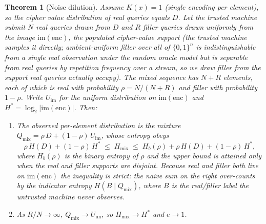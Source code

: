 \documentclass[11pt]{article}
\theoremstyle{definition}
\theoremstyle{plain}
\newtheorem{theorem}{Theorem}[section]
\theoremstyle{remark}
\newcommand{\enc}{\mathrm{enc}}
\newcommand{\B}{\{0,1\}}
\begin{document}
\begin{theorem}[Noise dilution]
\label{thm:noise-dilution}
Assume $K(x) = 1$ (single encoding per element), so the cipher value
distribution of real queries equals $D$.
Let the trusted machine submit $N$ real queries drawn from $D$ and
$R$ filler queries drawn uniformly from the image $\mathrm{im}(\enc)$,
the populated cipher-value support (the trusted machine samples it
directly; ambient-uniform filler over all of $\B^n$ is indistinguishable
from a single real observation under the random oracle model but is
separable from real queries by repetition frequency over a stream, so we
draw filler from the support real queries actually occupy).  The mixed
sequence has $N + R$ elements, each of which is real with probability
$\rho = N / (N + R)$ and filler with probability $1 - \rho$.  Write
$U_{\mathrm{im}}$ for the uniform distribution on $\mathrm{im}(\enc)$ and
$H^* = \log_2|\mathrm{im}(\enc)|$.  Then:
\begin{enumerate}
\item The observed per-element distribution is the mixture
  $Q_{\mathrm{mix}} = \rho\,D + (1 - \rho)\,U_{\mathrm{im}}$, whose
  entropy obeys
\begin{equation}
\label{eq:noise-entropy}
\rho\,H(D) + (1 - \rho)\,H^*
\;\leq\; H_{\mathrm{mix}}
\;\leq\; H_b(\rho) + \rho\,H(D) + (1 - \rho)\,H^*,
\end{equation}
where $H_b(\rho)$ is the binary entropy of $\rho$ and the upper bound is
attained only when the real and filler supports are disjoint.  Because
real and filler both live on $\mathrm{im}(\enc)$ the inequality is
strict: the naive sum on the right over-counts by the indicator entropy
$H(B \mid Q_{\mathrm{mix}})$, where $B$ is the real/filler label the
untrusted machine never observes.

\item As $R/N \to \infty$, $Q_{\mathrm{mix}} \to U_{\mathrm{im}}$, so
  $H_{\mathrm{mix}} \to H^*$ and $e \to 1$.


\end{enumerate}
\end{theorem}
\end{document}
